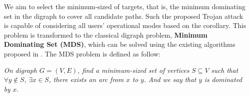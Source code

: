 We aim to select the minimum-sized of targets, that is, the minimum dominating set in the digraph to cover all candidate paths. Such the proposed Trojan attack is capable of considering all users' operational modes based on the corollary. This problem is transformed to the classical digraph problem, \textbf{Minimum Dominating Set (MDS)}, which can be solved using the existing algorithms proposed in \cite{ore1962theory}\cite{natarajan1978optimum}. The MDS problem is defined as follow:

\textit{On digraph $G = (V, E)$, find a minimum-sized set of vertices $S \subseteq V$ such that $\forall y \notin S$, $\exists x \in S$, there exists an arc from $x$ to $y$. And we say that $y$ is dominated by $x$}.


